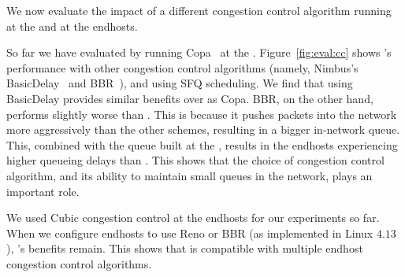 We now evaluate the impact of a different congestion control algorithm running at the \inbox and at the endhosts.



 So far we have evaluated \name by running Copa~\cite{copa} at the \inbox.  
Figure~\ref{fig:eval:cc} shows \name's performance with other congestion control algorithms (namely, Nimbus's BasicDelay~\cite{nimbus} and BBR~\cite{bbr}), and using SFQ scheduling. 
We find that using BasicDelay provides similar benefits over \baseline as Copa. 
BBR, on the other hand, performs slightly worse than \baseline. 
This is because it pushes packets into the network more aggressively than the other schemes, resulting in a bigger in-network queue.
This, combined with the queue built at the \name, results in the endhosts experiencing higher queueing delays than \baseline. This shows that the choice of congestion control algorithm, and its ability to maintain small queues in the network, plays an important role. 


We used Cubic congestion control at the endhosts for our experiments so far. When we configure endhosts to use Reno or BBR (as implemented in Linux $4.13$), \name's benefits remain.
This shows that \name is compatible with multiple endhost congestion control algorithms.
